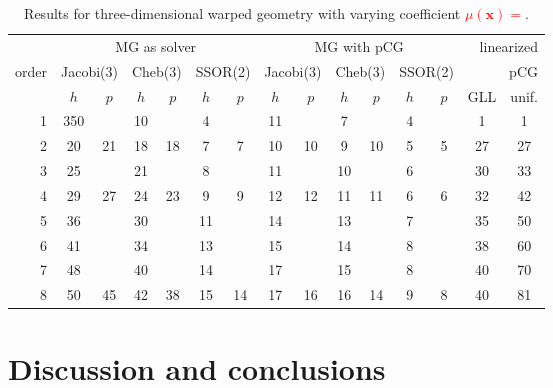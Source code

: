 \documentclass[smallcondensed,final]{svjour3}     %
\newcommand{\todo}[1]{\textcolor{red}{\bf #1}}
\newcommand{\bs}[1]{\ensuremath{\boldsymbol #1}}
\begin{document}
\begin{table}
  \caption{\label{tab:3d-fan} Results for three-dimensional warped geometry
    with varying coefficient \todo{$\mu(\bs x)=$}.}
  \centering
  \begin{tabular}{|r|c c|c c|c c||c c|c c|c c||c c|} 
    \hline
    & \multicolumn{6}{c||}{MG as solver} & \multicolumn{6}{c||}{MG with pCG} & \multicolumn{2}{r|}{linearized} \\
    \cline{2-13}
    \!\!\! order \!\!\!\! &  \multicolumn{2}{c|}{\!\scriptsize  Jacobi(3)\!} &  \multicolumn{2}{c|}{\!\scriptsize Cheb(3)\!} & \multicolumn{2}{c||}{\!\scriptsize  SSOR(2)\!} & \multicolumn{2}{c|}{\!\scriptsize Jacobi(3)\!} &  \multicolumn{2}{c|}{\!\scriptsize Cheb(3)\!} & \multicolumn{2}{c||}{\!\scriptsize SSOR(2)\!} & \multicolumn{2}{r|}{pCG}\\
\hline
 & $h$ & $p$ & $h$ & $p$& $h$ & $p$& $h$ & $p$& $h$ & $p$& $h$ & $p$& GLL & unif.\\
 \cline{2-15}
1 & 350 & & 10 & & 4 & & 11 & & 7 & & 4 & & 1 & 1  \\
2 & 20 & 21 & 18 & 18 & 7 & 7 & 10 & 10 & 9 & 10 & 5 & 5 & 27 & 27 \\
3 & 25 & & 21 & & 8 & & 11 & & 10 & & 6 & & 30 & 33  \\
4 & 29 & 27 & 24 & 23 & 9 & 9 & 12 & 12 & 11 & 11 & 6 & 6 & 32 & 42 \\
5 & 36 & & 30 & & 11 & & 14 & & 13 & & 7 & & 35 & 50  \\
6 & 41 & & 34 & & 13 & & 15 & & 14 & & 8 & & 38 & 60  \\
7 & 48 & & 40 & & 14 & & 17 & & 15 & & 8 & & 40 & 70  \\
8 & 50 & 45 & 42 & 38 & 15 & 14 & 17 & 16 & 16 & 14 & 9 & 8 & 40 & 81 \\
\hline
  \end{tabular}
\end{table}


\section{Discussion and conclusions}

\end{document}
